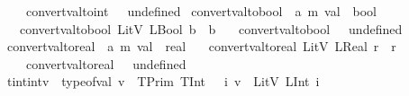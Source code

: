 \begin{isabellebody}
\ \ {\isacharbar}{\kern0pt}\ \ {\isachardoublequoteopen}convert{\isacharunderscore}{\kern0pt}val{\isacharunderscore}{\kern0pt}to{\isacharunderscore}{\kern0pt}int\ {\isacharunderscore}{\kern0pt}\ {\isacharequal}{\kern0pt}\ undefined{\isachardoublequoteclose}\isanewline
\isanewline
{}\isamarkupfalse%
\ convert{\isacharunderscore}{\kern0pt}val{\isacharunderscore}{\kern0pt}to{\isacharunderscore}{\kern0pt}bool\ {\isacharcolon}{\kern0pt}{\isacharcolon}{\kern0pt}\ {\isachardoublequoteopen}{\isacharparenleft}{\kern0pt}{\isacharprime}{\kern0pt}a{\isacharcomma}{\kern0pt}\ {\isacharprime}{\kern0pt}m{\isacharparenright}{\kern0pt}\ val\ {\isasymRightarrow}\ bool{\isachardoublequoteclose}\isanewline
\ \ \ {\isachardoublequoteopen}convert{\isacharunderscore}{\kern0pt}val{\isacharunderscore}{\kern0pt}to{\isacharunderscore}{\kern0pt}bool\ {\isacharparenleft}{\kern0pt}LitV\ {\isacharparenleft}{\kern0pt}LBool\ b{\isacharparenright}{\kern0pt}{\isacharparenright}{\kern0pt}\ {\isacharequal}{\kern0pt}\ b{\isachardoublequoteclose}\isanewline
\ \ {\isacharbar}{\kern0pt}\ {\isachardoublequoteopen}convert{\isacharunderscore}{\kern0pt}val{\isacharunderscore}{\kern0pt}to{\isacharunderscore}{\kern0pt}bool\ {\isacharunderscore}{\kern0pt}\ {\isacharequal}{\kern0pt}\ undefined{\isachardoublequoteclose}\isanewline
\isanewline
{}\isamarkupfalse%
\ convert{\isacharunderscore}{\kern0pt}val{\isacharunderscore}{\kern0pt}to{\isacharunderscore}{\kern0pt}real\ {\isacharcolon}{\kern0pt}{\isacharcolon}{\kern0pt}\ {\isachardoublequoteopen}{\isacharparenleft}{\kern0pt}{\isacharprime}{\kern0pt}a{\isacharcomma}{\kern0pt}\ {\isacharprime}{\kern0pt}m{\isacharparenright}{\kern0pt}\ val\ {\isasymRightarrow}\ real{\isachardoublequoteclose}\isanewline
\ \ \ {\isachardoublequoteopen}convert{\isacharunderscore}{\kern0pt}val{\isacharunderscore}{\kern0pt}to{\isacharunderscore}{\kern0pt}real\ {\isacharparenleft}{\kern0pt}LitV\ {\isacharparenleft}{\kern0pt}LReal\ r{\isacharparenright}{\kern0pt}{\isacharparenright}{\kern0pt}\ {\isacharequal}{\kern0pt}\ r{\isachardoublequoteclose}\isanewline
\ \ {\isacharbar}{\kern0pt}\ \ {\isachardoublequoteopen}convert{\isacharunderscore}{\kern0pt}val{\isacharunderscore}{\kern0pt}to{\isacharunderscore}{\kern0pt}real\ {\isacharunderscore}{\kern0pt}\ {\isacharequal}{\kern0pt}\ undefined{\isachardoublequoteclose}\isanewline
\isanewline
{}\isamarkupfalse%
\ tint{\isacharunderscore}{\kern0pt}intv{\isacharcolon}{\kern0pt}\ {\isachardoublequoteopen}{\isasymlbrakk}\ type{\isacharunderscore}{\kern0pt}of{\isacharunderscore}{\kern0pt}val\ v\ {\isacharequal}{\kern0pt}\ TPrim\ TInt\ {\isasymrbrakk}\ {\isasymLongrightarrow}\ {\isasymexists}i{\isachardot}{\kern0pt}\ v\ {\isacharequal}{\kern0pt}\ LitV\ {\isacharparenleft}{\kern0pt}LInt\ i{\isacharparenright}{\kern0pt}{\isachardoublequoteclose}\isanewline

\end{isabellebody}
